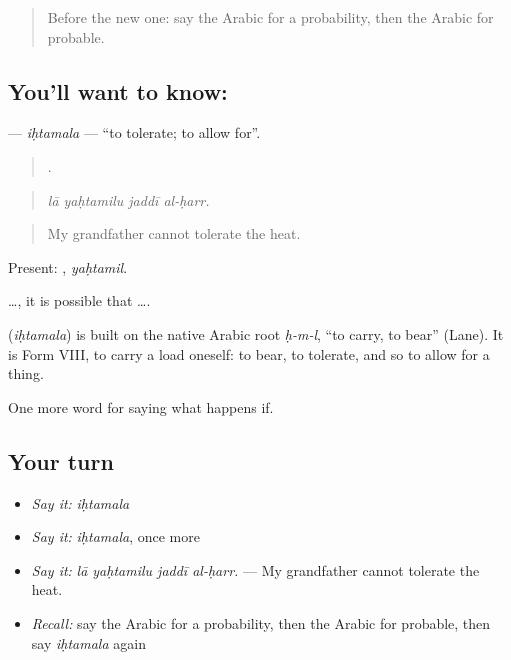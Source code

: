 \label{lesson:AR-C401-ihtamala}



\begin{quote}
Before the new one: say the Arabic for a probability, then the Arabic for probable.
\end{quote}

\subsection*{You'll want to know: }
\textbf{} — \emph{iḥtamala} — \textquotedblleft{}to tolerate; to allow for\textquotedblright{}.

\begin{quote}
   .
\end{quote}

\begin{quote}
\emph{lā yaḥtamilu jaddī al-ḥarr.}
\end{quote}

\begin{quote}
My grandfather cannot tolerate the heat.
\end{quote}

Present: , \emph{yaḥtamil}.

  …, it is possible that ….

\begin{cousinweb}
\textbf{} (\emph{iḥtamala}) is built on the native Arabic root \emph{ḥ-m-l}, \textquotedblleft{}to carry, to bear\textquotedblright{} (Lane). It is Form VIII, to carry a load oneself: to bear, to tolerate, and so to allow for a thing.
\end{cousinweb}

\begin{grammarlens}[title={What you've built}]
One more word for saying what happens if.
\end{grammarlens}

\subsection*{Your turn}
\begin{itemize}
\raggedright
  \item \emph{Say it:} \emph{iḥtamala}
  \item \emph{Say it:} \emph{iḥtamala}, once more
  \item \emph{Say it:} \emph{lā yaḥtamilu jaddī al-ḥarr.} — My grandfather cannot tolerate the heat.
  \item \emph{Recall:} say the Arabic for a probability, then the Arabic for probable, then say \emph{iḥtamala} again
\end{itemize}

